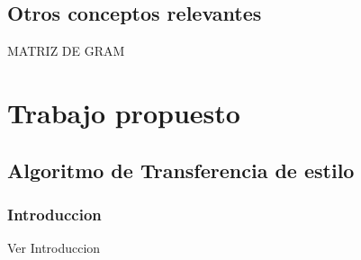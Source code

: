 \documentclass[a4paper,10pt]{article}
\begin{document}
     \subsection {Otros conceptos relevantes}
     MATRIZ DE GRAM
     
\section{Trabajo propuesto}
  \subsection{Algoritmo de Transferencia de estilo}
    \subsubsection{Introduccion}
    Ver Introduccion 
\end{document}
